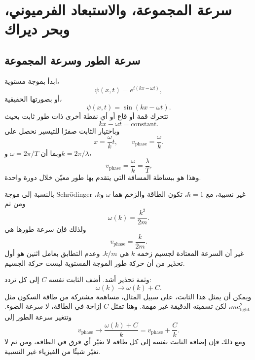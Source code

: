 \chapter{سرعة المجموعة، والاستبعاد الفرميوني، وبحر ديراك}

\section{سرعة الطور وسرعة المجموعة}

\begin{classroomqa}
\end{classroomqa}

ابدأ بموجة مستوية،
\begin{equation}
\psi(x,t)=e^{i(kx-\omega t)},
\end{equation}
أو بصورتها الحقيقية،
\begin{equation}
\psi(x,t)=\sin(kx-\omega t).
\end{equation}
تتحرك قمة أو قاع أو أي نقطة أخرى ذات طور ثابت بحيث
\begin{equation}
kx-\omega t=\text{constant}.
\end{equation}
وباختيار الثابت صفرًا للتيسير نحصل على
\begin{equation}
x=\frac{\omega}{k}t,
\qquad
v_{\mathrm{phase}}=\frac{\omega}{k}.
\end{equation}
وبما أن \(\omega=2\pi/T\) و\(k=2\pi/\lambda\)،
\begin{equation}
v_{\mathrm{phase}}=\frac{\omega}{k}=\frac{\lambda}{T}.
\end{equation}
وهذا هو ببساطة المسافة التي يتقدم بها طور معيّن خلال دورة واحدة.

بالنسبة إلى موجة Schr\"odinger غير نسبية، مع \(\hbar=1\)، تكون الطاقة والزخم هما \(\omega\) و\(k\)، ومن ثم
\begin{equation}
\omega(k)=\frac{k^2}{2m}.
\end{equation}
ولذلك فإن سرعة طورها هي
\begin{equation}
v_{\mathrm{phase}}=\frac{k}{2m}.
\end{equation}
غير أن السرعة المعتادة لجسيم زخمه \(k\) هي \(k/m\). وعدم التطابق بعامل اثنين هو أول تحذير من أن حركة طور الموجة المستوية ليست حركة الجسيم.

وثمة تحذير أشد. أضف الثابت نفسه \(C\) إلى كل تردد:
\begin{equation}
\omega(k)\longrightarrow \omega(k)+C.
\end{equation}
ويمكن أن يمثل هذا الثابت، على سبيل المثال، مساهمة مشتركة من طاقة السكون مثل \(mc_{\mathrm{light}}^2\)، لكن تسميته الدقيقة غير مهمة. وهنا تمثل \(C\) إزاحة في الطاقة، لا سرعة الضوء. وتتغير سرعة الطور إلى
\begin{equation}
v_{\mathrm{phase}}\longrightarrow
\frac{\omega(k)+C}{k}
=v_{\mathrm{phase}}+\frac{C}{k}.
\end{equation}
ومع ذلك فإن إضافة الثابت نفسه إلى كل طاقة لا تغيّر أي فرق في الطاقة، ومن ثم لا تغيّر شيئًا من الفيزياء غير النسبية.

